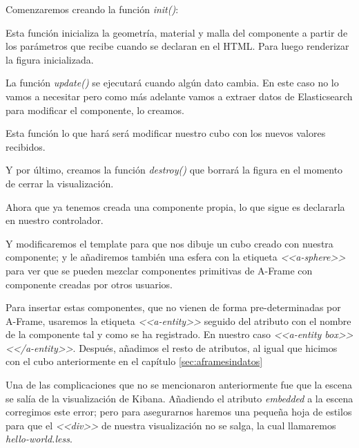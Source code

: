 \documentclass[a4paper, 12pt]{book}
\begin{document}
Comenzaremos creando la función \textit{init()}:



Esta función inicializa la geometría, material y malla del componente a partir de los parámetros que recibe cuando se declaran en el HTML. Para luego renderizar la figura inicializada.

La función \textit{update()} se ejecutará cuando algún dato cambia. En este caso no lo vamos a necesitar pero como más adelante vamos a extraer datos de Elasticsearch para modificar el componente, lo creamos.



Esta función lo que hará será modificar nuestro cubo con los nuevos valores recibidos.

Y por último, creamos la función \textit{destroy()} que borrará la figura en el momento de cerrar la visualización.



Ahora que ya tenemos creada una componente propia, lo que sigue es declararla en nuestro controlador.



Y modificaremos el template para que nos dibuje un cubo creado con nuestra componente; y le añadiremos también una esfera con la etiqueta \textit{<<a-sphere>>} para ver que se pueden mezclar componentes primitivas de A-Frame con componente creadas por otros usuarios. 

Para insertar estas componentes, que no vienen de forma pre-determinadas por A-Frame, usaremos la etiqueta \textit{<<a-entity>>} seguido del atributo con el nombre de la componente tal y como se ha registrado. En nuestro caso \textit{<<a-entity box>><</a-entity>>}. Después, añadimos el resto de atributos, al igual que hicimos con el cubo anteriormente en el capítulo \ref{sec:aframesindatos}



Una de las complicaciones que no se mencionaron anteriormente fue que la escena se salía de la visualización de Kibana. Añadiendo el atributo \textit{embedded} a la escena corregimos este error; pero para asegurarnos haremos una pequeña hoja de estilos para que el \textit{<<div>>} de nuestra visualización no se salga, la cual llamaremos \textit{hello-world.less}.
\end{document}
